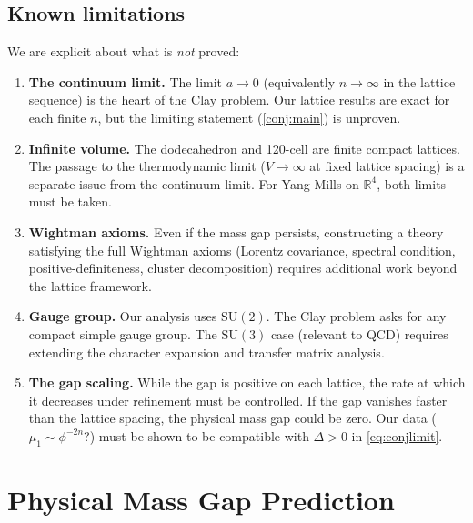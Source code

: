 \documentclass[12pt,a4paper]{article}
\theoremstyle{definition}
\theoremstyle{remark}
\newcommand{\R}{\mathbb{R}}
\newcommand{\SU}{\mathrm{SU}}
\newcommand{\ph}{\phi}
\begin{document}
\subsection{Known limitations}\label{ssec:limitations}

We are explicit about what is \emph{not} proved:

\begin{enumerate}[label=\textbf{L\arabic*.}, leftmargin=2em]

\item \textbf{The continuum limit.}
The limit $a \to 0$ (equivalently $n \to \infty$ in the lattice sequence)
is the heart of the Clay problem.  Our lattice results are exact for each
finite $n$, but the limiting statement (\cref{conj:main}) is unproven.

\item \textbf{Infinite volume.}
The dodecahedron and 120-cell are finite compact lattices.  The
passage to the thermodynamic limit ($V \to \infty$ at fixed lattice
spacing) is a separate issue from the continuum limit.  For Yang-Mills
on $\R^4$, both limits must be taken.

\item \textbf{Wightman axioms.}
Even if the mass gap persists, constructing a theory satisfying the
full Wightman axioms (Lorentz covariance, spectral condition,
positive-definiteness, cluster decomposition) requires additional
work beyond the lattice framework.

\item \textbf{Gauge group.}
Our analysis uses $\SU(2)$.  The Clay problem asks for any compact simple
gauge group.  The $\SU(3)$ case (relevant to QCD) requires extending
the character expansion and transfer matrix analysis.

\item \textbf{The gap scaling.}
While the gap is positive on each lattice, the rate at which it decreases
under refinement must be controlled.  If the gap vanishes faster than the
lattice spacing, the physical mass gap could be zero.  Our data
($\mu_1 \sim \ph^{-2n}$?) must be shown to be compatible with
$\Delta > 0$ in \cref{eq:conjlimit}.
\end{enumerate}

\section{Physical Mass Gap Prediction}\label{sec:physical}
\end{document}
